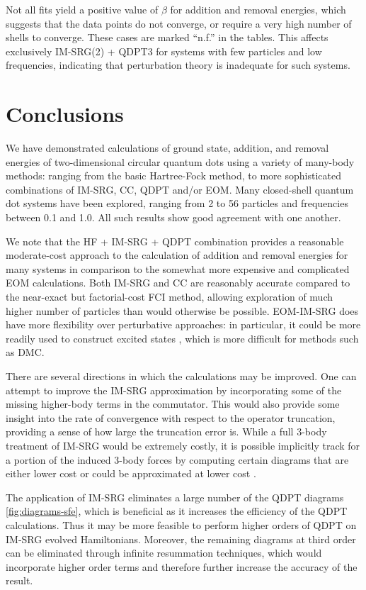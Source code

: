 Not all fits yield a positive value of $\beta$ for addition and removal energies, which suggests that the data points do not converge, or require a very high number of shells to converge.  These cases are marked ``n.f.'' in the tables.  This affects exclusively IM-SRG(2) + QDPT3 for systems with few particles and low frequencies, indicating that perturbation theory is inadequate for such systems.

\section{Conclusions}
\label{sec:conclusions}

We have demonstrated calculations of ground state, addition, and removal energies of two-dimensional circular quantum dots using a variety of many-body methods: ranging from the basic Hartree-Fock method, to more sophisticated combinations of IM-SRG, CC, QDPT and/or EOM.  Many closed-shell quantum dot systems have been explored, ranging from 2 to 56 particles and frequencies between 0.1 and 1.0.  All such results show good agreement with one another.

We note that the HF + IM-SRG + QDPT combination provides a reasonable moderate-cost approach to the calculation of addition and removal energies for many systems in comparison to the somewhat more expensive and complicated EOM calculations.  Both IM-SRG and CC are reasonably accurate compared to the near-exact but factorial-cost FCI method, allowing exploration of much higher number of particles than would otherwise be possible.  EOM-IM-SRG does have more flexibility over perturbative approaches: in particular, it could be more readily used to construct excited states \cite{2016arXiv161100661P}, which is more difficult for methods such as DMC.

There are several directions in which the calculations may be improved.  One can attempt to improve the IM-SRG approximation by incorporating some of the missing higher-body terms in the commutator.  This would also provide some insight into the rate of convergence with respect to the operator truncation, providing a sense of how large the truncation error is.  While a full 3-body treatment of IM-SRG would be extremely costly, it is possible implicitly track for a portion of the induced 3-body forces by computing certain diagrams that are either lower cost or could be approximated at lower cost \cite{IMSRG}.

The application of IM-SRG eliminates a large number of the QDPT diagrams \ref{fig:diagrams-sfe}, which is beneficial as it increases the efficiency of the QDPT calculations.  Thus it may be more feasible to perform higher orders of QDPT on IM-SRG evolved Hamiltonians.  Moreover, the remaining diagrams at third order can be eliminated through infinite resummation techniques, which would incorporate higher order terms and therefore further increase the accuracy of the result.

